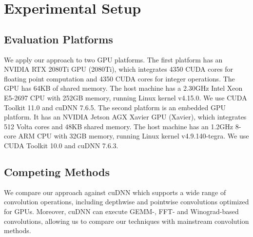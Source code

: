 

\section{Experimental Setup}

\subsection{Evaluation Platforms} We apply our approach to two GPU platforms.
The first platform has an NVIDIA RTX 2080Ti GPU (2080Ti), which integrates 4350 CUDA cores for floating point computation and 4350 CUDA
cores for integer operations. The GPU has 64KB of shared memory. The host machine has a 2.30GHz Intel Xeon E5-2697 CPU with 252GB memory,
running Linux kernel v4.15.0. We use CUDA Toolkit 11.0 and cuDNN 7.6.5. The second platform is an embedded GPU platform. It has an NVIDIA
Jetson AGX Xavier GPU (Xavier), which integrates 512 Volta cores and 48KB shared memory. The host machine has an 1.2GHz 8-core ARM CPU with
32GB memory, running Linux kernel v4.9.140-tegra. We use CUDA Toolkit 10.0 and cuDNN 7.6.3.


\subsection{Competing Methods} We compare our approach against cuDNN \cite{ChetlurWVCTCS14} which supports a wide range of convolution operations,
 including depthwise and pointwise convolutions optimized for GPUs.  Moreover, cuDNN can execute GEMM-, FFT- and Winograd-based convolutions, allowing
 us to compare our techniques with mainstream convolution methods.


%
%


